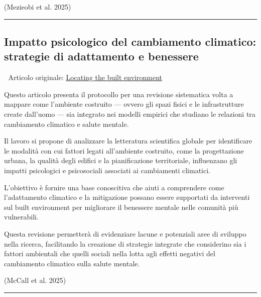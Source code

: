 \documentclass[
  italian,
]{article}
\begin{document}
(Mezieobi et al. 2025)

\begin{center}\rule{0.5\linewidth}{0.5pt}\end{center}

\subsection{Impatto psicologico del cambiamento climatico: strategie di
adattamento e
benessere}\label{impatto-psicologico-del-cambiamento-climatico-strategie-di-adattamento-e-benessere}

📄 Articolo originale:
\href{https://www.sciencedirect.com/science/article/pii/S1877343524000800}{Locating
the built environment}

Questo articolo presenta il protocollo per una revisione sistematica
volta a mappare come l'ambiente costruito --- ovvero gli spazi fisici e
le infrastrutture create dall'uomo --- sia integrato nei modelli
empirici che studiano le relazioni tra cambiamento climatico e salute
mentale.

Il lavoro si propone di analizzare la letteratura scientifica globale
per identificare le modalità con cui fattori legati all'ambiente
costruito, come la progettazione urbana, la qualità degli edifici e la
pianificazione territoriale, influenzano gli impatti psicologici e
psicosociali associati ai cambiamenti climatici.

L'obiettivo è fornire una base conoscitiva che aiuti a comprendere come
l'adattamento climatico e la mitigazione possano essere supportati da
interventi sul built environment per migliorare il benessere mentale
nelle comunità più vulnerabili.

Questa revisione permetterà di evidenziare lacune e potenziali aree di
sviluppo nella ricerca, facilitando la creazione di strategie integrate
che considerino sia i fattori ambientali che quelli sociali nella lotta
agli effetti negativi del cambiamento climatico sulla salute mentale.

(McCall et al. 2025)

\begin{center}\rule{0.5\linewidth}{0.5pt}\end{center}
\end{document}
